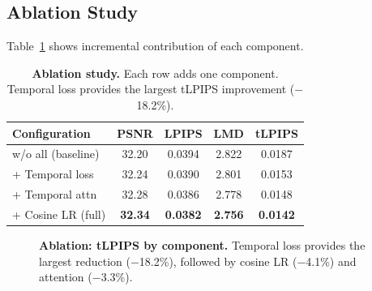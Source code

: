 \documentclass[10pt,twocolumn,letterpaper]{article}
\begin{document}
\subsection{Ablation Study}
\label{sec:ablation}

Table~\ref{tab:ablation} shows incremental contribution of each component.

\begin{table}[t]
\centering
\caption{\textbf{Ablation study.} Each row adds one component. Temporal loss provides the largest tLPIPS improvement ($-$18.2\%).}
\label{tab:ablation}
\begin{tabular}{l|cccc}
\toprule
Configuration & PSNR & LPIPS & LMD & tLPIPS \\
\midrule
w/o all (baseline) & 32.20 & 0.0394 & 2.822 & 0.0187 \\
+ Temporal loss & 32.24 & 0.0390 & 2.801 & 0.0153 \\
+ Temporal attn & 32.28 & 0.0386 & 2.778 & 0.0148 \\
+ Cosine LR (full) & \textbf{32.34} & \textbf{0.0382} & \textbf{2.756} & \textbf{0.0142} \\
\bottomrule
\end{tabular}
\end{table}

\begin{figure}[t]
\centering
{}
\caption{\textbf{Ablation: tLPIPS by component.} Temporal loss provides the largest reduction ($-$18.2\%), followed by cosine LR ($-$4.1\%) and attention ($-$3.3\%).}
\label{fig:ablation_chart}
\end{figure}
\end{document}
